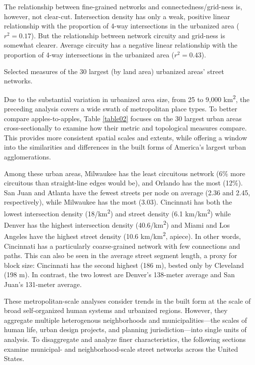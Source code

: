 \documentclass[Afour,sageh,times]{sage/sagej}
\begin{document}
The relationship between fine-grained networks and connectedness/grid-ness is, however, not clear-cut. Intersection density has only a weak, positive linear relationship with the proportion of 4-way intersections in the urbanized area ($r^{2}=0.17$). But the relationship between network circuity and grid-ness is somewhat clearer. Average circuity has a negative linear relationship with the proportion of 4-way intersections in the urbanized area ($r^{2}=0.43$).

\begin{table}[h]
\caption{Selected measures of the 30 largest (by land area) urbanized areas' street networks.}
\label{table02}
\end{table}

Due to the substantial variation in urbanized area size, from 25 to 9,000 km\textsuperscript{2}, the preceding analysis covers a wide swath of metropolitan place types. To better compare apples-to-apples, Table \ref{table02} focuses on the 30 largest urban areas cross-sectionally to examine how their metric and topological measures compare. This provides more consistent spatial scales and extents, while offering a window into the similarities and differences in the built forms of America's largest urban agglomerations. 

Among these urban areas, Milwaukee has the least circuitous network (6\% more circuitous than straight-line edges would be), and Orlando has the most (12\%). San Juan and Atlanta have the fewest streets per node on average (2.36 and 2.45, respectively), while Milwaukee has the most (3.03). Cincinnati has both the lowest intersection density (18/km\textsuperscript{2}) and street density (6.1 km/km\textsuperscript{2}) while Denver has the highest intersection density (40.6/km\textsuperscript{2}) and Miami and Los Angeles have the highest street density (10.6 km/km\textsuperscript{2}, apiece). In other words, Cincinnati has a particularly coarse-grained network with few connections and paths. This can also be seen in the average street segment length, a proxy for block size: Cincinnati has the second highest (186 m), bested only by Cleveland (198 m). In contrast, the two lowest are Denver's 138-meter average and San Juan's 131-meter average.

These metropolitan-scale analyses consider trends in the built form at the scale of broad self-organized human systems and urbanized regions. However, they aggregate multiple heterogenous neighborhoods and municipalities---the scales of human life, urban design projects, and planning jurisdiction---into single units of analysis. To disaggregate and analyze finer characteristics, the following sections examine municipal- and neighborhood-scale street networks across the United States.
\end{document}
